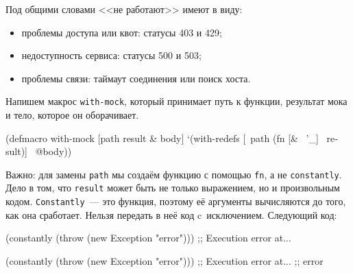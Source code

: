 Под общими словами <<не работают>> имеют в виду:


\begin{itemize}

\item
  проблемы доступа или квот: статусы 403 и 429;

\item
  недоступность сервиса: статусы 500 и 503;

\item
  проблемы связи: таймаут соединения или поиск хоста.

\end{itemize}

Напишем макрос \verb|with-mock|, который принимает путь к функции, результат
мока и тело, которое он оборачивает.


\begin{english}
  \begin{clojure}
(defmacro with-mock
  [path result & body]
  `(with-redefs
     [~path (fn [& ~'_] ~result)]
     ~@body))
  \end{clojure}
\end{english}

Важно: для замены \verb|path| мы создаём функцию с помощью \verb|fn|, а не
\verb|constantly|. Дело в том, что \verb|result| может быть не только
выражением, но и произвольным кодом. \verb|Constantly|~--- это функция, поэтому её
аргументы вычисляются до того, как она сработает. Нельзя передать в неё код
c~исключением. Следующий код:

\ifx\devicetype\mobile

\begin{english}
  \begin{clojure}
(constantly
  (throw (new Exception "error")))
;; Execution error at...
  \end{clojure}
\end{english}

\else

\begin{english}
  \begin{clojure}
(constantly (throw (new Exception "error")))
;; Execution error at...
;; error
  \end{clojure}
\end{english}

\fi


